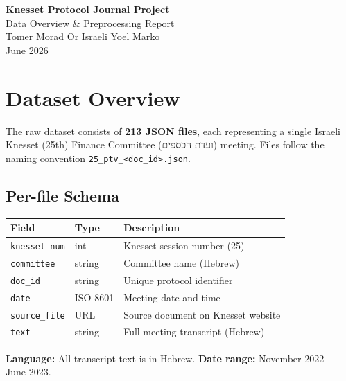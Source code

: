 \documentclass[11pt,a4paper]{article}
\begin{document}
\begin{center}
  {\LARGE \textbf{Knesset Protocol Journal Project}}\\[0.4em]
  {\large Data Overview \& Preprocessing Report}\\[0.6em]
  {\normalsize Tomer Morad \quad Or Israeli \quad Yoel Marko}\\
  {\normalsize June 2026}
\end{center}

\vspace{1em}

\section{Dataset Overview}

The raw dataset consists of \textbf{213 JSON files}, each representing a single Israeli
Knesset (25th) Finance Committee
(\texthebrew{ועדת הכספים}) meeting. Files follow the naming
convention \texttt{25\_ptv\_<doc\_id>.json}.

\subsection*{Per-file Schema}

\begin{center}
\begin{tabular}{lll}
\toprule
\textbf{Field} & \textbf{Type} & \textbf{Description} \\
\midrule
\texttt{knesset\_num} & int & Knesset session number (25) \\
\texttt{committee}    & string & Committee name (Hebrew) \\
\texttt{doc\_id}      & string & Unique protocol identifier \\
\texttt{date}         & ISO 8601 & Meeting date and time \\
\texttt{source\_file} & URL & Source document on Knesset website \\
\texttt{text}         & string & Full meeting transcript (Hebrew) \\
\bottomrule
\end{tabular}
\end{center}

\textbf{Language:} All transcript text is in Hebrew.
\textbf{Date range:} November 2022 -- June 2023.

\end{document}
